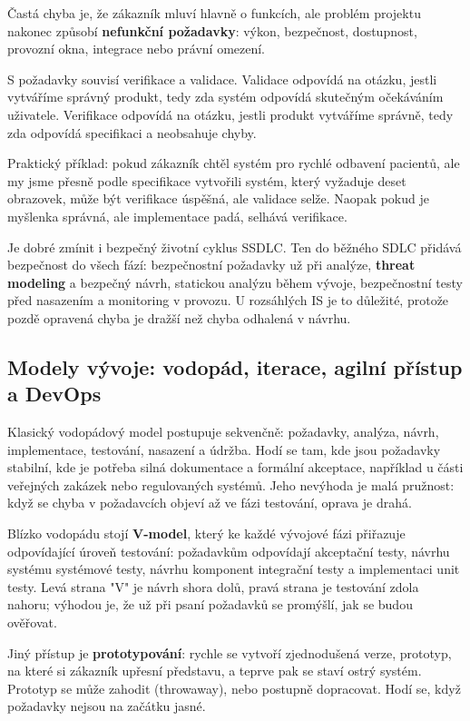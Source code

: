 Častá chyba je, že zákazník mluví hlavně o funkcích, ale problém projektu nakonec způsobí \textbf{nefunkční požadavky}: výkon, bezpečnost, dostupnost, provozní okna, integrace nebo právní omezení.

S požadavky souvisí verifikace a validace. Validace odpovídá na otázku, jestli vytváříme správný produkt, tedy zda systém odpovídá skutečným očekáváním uživatele. Verifikace odpovídá na otázku, jestli produkt vytváříme správně, tedy zda odpovídá specifikaci a neobsahuje chyby.

Praktický příklad: pokud zákazník chtěl systém pro rychlé odbavení pacientů, ale my jsme přesně podle specifikace vytvořili systém, který vyžaduje deset obrazovek, může být verifikace úspěšná, ale validace selže. Naopak pokud je myšlenka správná, ale implementace padá, selhává verifikace.

Je dobré zmínit i bezpečný životní cyklus SSDLC. Ten do běžného SDLC přidává bezpečnost do všech fází: bezpečnostní požadavky už při analýze, \textbf{threat modeling} a bezpečný návrh, statickou analýzu během vývoje, bezpečnostní testy před nasazením a monitoring v provozu. U rozsáhlých IS je to důležité, protože pozdě opravená chyba je dražší než chyba odhalená v návrhu.

\subsection*{Modely vývoje: vodopád, iterace, agilní přístup a DevOps}

Klasický vodopádový model postupuje sekvenčně: požadavky, analýza, návrh, implementace, testování, nasazení a údržba. Hodí se tam, kde jsou požadavky stabilní, kde je potřeba silná dokumentace a formální akceptace, například u části veřejných zakázek nebo regulovaných systémů. Jeho nevýhoda je malá pružnost: když se chyba v požadavcích objeví až ve fázi testování, oprava je drahá.

Blízko vodopádu stojí \textbf{V-model}, který ke každé vývojové fázi přiřazuje odpovídající úroveň testování: požadavkům odpovídají akceptační testy, návrhu systému systémové testy, návrhu komponent integrační testy a implementaci unit testy. Levá strana "V" je návrh shora dolů, pravá strana je testování zdola nahoru; výhodou je, že už při psaní požadavků se promýšlí, jak se budou ověřovat.

Jiný přístup je \textbf{prototypování}: rychle se vytvoří zjednodušená verze, prototyp, na které si zákazník upřesní představu, a teprve pak se staví ostrý systém. Prototyp se může zahodit (throwaway), nebo postupně dopracovat. Hodí se, když požadavky nejsou na začátku jasné.

